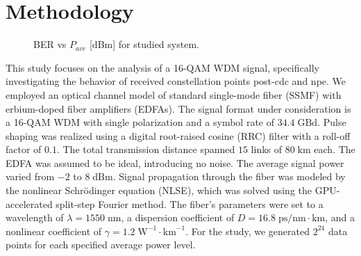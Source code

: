 \section{Methodology}

\begin{figure}[htpb]
    \caption{BER vs $P_{ave}$ \textrm{[dBm]} for studied system.}
    \label{fig:ber_vs_pave_z1200}
\end{figure}

This study focuses on the analysis of a 16-QAM WDM signal, specifically investigating the behavior of received constellation points post-\Gls{cdc} and \Gls{npe}.
We employed an optical channel model of standard single-mode fiber (SSMF) with erbium-doped fiber amplifiers (EDFAs). The signal format under consideration is a 16-QAM WDM with single polarization and a symbol rate of \(34.4\; \text{GBd}\). Pulse shaping was realized using a digital root-raised cosine (RRC) filter with a roll-off factor of \(0.1\). The total transmission distance spanned \(15\) links of \(80\; \text{km}\) each. The EDFA was assumed to be ideal, introducing no noise. The average signal power varied from \(-2\) to \(8\; \text{dBm}\).
Signal propagation through the fiber was modeled by the nonlinear Schrödinger equation (NLSE), which was solved using the GPU-accelerated split-step Fourier method\cite{esf0_2023_7880552}. The fiber's parameters were set to a wavelength of \(\lambda = 1550\; \text{nm}\), a dispersion coefficient of \(D = 16.8\; \text{ps/nm}\cdot\text{km}\), and a nonlinear coefficient of \(\gamma = 1.2\; \text{W}^{-1}\cdot\text{km}^{-1}\).
For the study, we generated \(2^{24}\) data points for each specified average power level.

